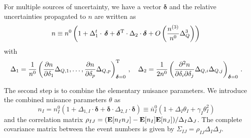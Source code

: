 \documentclass[11pt]{article}
\def\ie{{\it i.e.}}
\newcommand{\be}{\begin{equation}}
\newcommand{\ee}{\end{equation}}
\begin{document}

For multiple sources of uncertainty, we have a vector $\boldsymbol{\delta}$ and the relative uncertainties propagated to $n$ are written as
\be n\equiv n^{0}\left( 1+ \Delta_{1}^t\cdot \, \boldsymbol{\delta}+\boldsymbol{\delta}^{\rm T}\cdot\Delta_{2} \cdot \boldsymbol{\delta} +O\left(\frac{n^{(3)}}{n^{0}}\Delta_Q^3\right)
\right)\,
\label{eq:propmult}
\ee
with
\be
\Delta_1=\frac{1}{n^{0}}\left(\frac{\partial n }{\partial \delta_{1}}\Delta_{Q,1},\ldots,
\frac{ \partial n }{\partial \delta_{p}}\Delta_{Q,p} \right)_{\boldsymbol{\delta}=0}^{\rm T} \,, \label{eq:stdDelta1} \quad \Delta_2=\frac{1}{2n^{0}}\left(\frac{\partial^2 n}{\partial \delta_{i}\partial \delta_{j}}\Delta_{Q,i}\Delta_{Q,j}  \right)_{\boldsymbol{\delta}=0}\,.
\ee


The second step is to combine the elementary nuisance parameters. We introduce the combined nuisance parameters $\theta$ as
\be
n_I=n^{0}_{I}(1+\Delta_{1,I}\cdot\boldsymbol{\delta}+\boldsymbol{\delta}\cdot\Delta_{2,I}\cdot\boldsymbol{\delta}) \equiv
\bar n^{0}_{I}(1+\Delta_{I}\theta_I+ \gamma_I\theta_I^2) \label{eq:comb_def}
\ee
and the correlation matrix $\rho_{IJ}=({\bf E}[n_I n_J]-{\bf E}[n_I] {\bf E}[n_J])/\Delta_I \Delta_J$. The complete covariance matrix between the event numbers is given by $\Sigma_{IJ}=\rho_{IJ} \Delta_I\Delta_J$.
\end{document}

